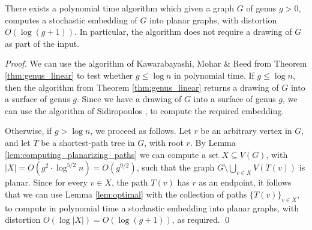 \documentclass[envcountsect]{llncs}
\begin{document}
\begin{theorem}
There exists a polynomial time algorithm which given a graph $G$ of genus $g>0$, computes a stochastic embedding of $G$ into planar graphs, with distortion $O(\log (g+1))$.
In particular, the algorithm does not require a drawing of $G$ as part of the input.
\end{theorem}
\begin{proof}
We can use the algorithm of Kawarabayashi, Mohar \& Reed from Theorem \ref{thm:genus_linear} to test whether $g\leq \log n$ in polynomial time.
If $g\leq \log n$, then the algorithm from Theorem \ref{thm:genus_linear} returns a drawing of $G$ into a surface of genus $g$.
Since we have a drawing of $G$ into a surface of genus $g$, we can use the algorithm of Sidiropoulos \cite{sidiropoulos2010optimal}, to compute the required embedding.

Otherwise, if $g>\log n$, we proceed as follows.
Let $r$ be an arbitrary vertex in $G$, and let $T$ be a shortest-path tree in $G$, with root $r$.
By Lemma \ref{lem:computing_planarizing_paths} we can compute a set $X\subseteq V(G)$, with $|X|=O(g^2\cdot \log^{5/2} n) = O(g^{9/2})$, such that the graph $G\setminus \bigcup_{v\in X} V(T(v))$ is planar.
Since for every $v\in X$, the path $T(v)$ has $r$ as an endpoint, it follows that we can use Lemma \ref{lem:optimal} with the collection of paths $\{T(v)\}_{v\in X}$, to compute in polynomial time a stochastic embedding into planar graphs, with distortion $O(\log |X|) = O(\log (g+1))$, as required.
\qed
\end{proof}






\end{document}
